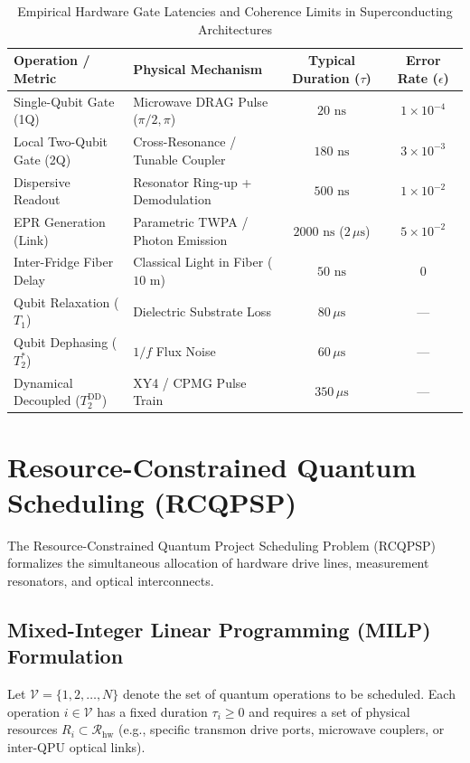 \begin{table}[htbp]
    \centering
    \caption{Empirical Hardware Gate Latencies and Coherence Limits in Superconducting Architectures}
    \label{tab:hardware_latencies_ch09}
    \begin{tabularx}{\textwidth}{X X c c}
        \toprule
        \textbf{Operation / Metric} & \textbf{Physical Mechanism} & \textbf{Typical Duration ($\tau$)} & \textbf{Error Rate ($\epsilon$)} \\
        \midrule
        Single-Qubit Gate (1Q) & Microwave DRAG Pulse ($\pi/2, \pi$) & $20\text{ ns}$ & $1 \times 10^{-4}$ \\
        Local Two-Qubit Gate (2Q) & Cross-Resonance / Tunable Coupler & $180\text{ ns}$ & $3 \times 10^{-3}$ \\
        Dispersive Readout & Resonator Ring-up + Demodulation & $500\text{ ns}$ & $1 \times 10^{-2}$ \\
        EPR Generation (Link) & Parametric TWPA / Photon Emission & $2000\text{ ns}$ ($2\,\mu\text{s}$) & $5 \times 10^{-2}$ \\
        Inter-Fridge Fiber Delay & Classical Light in Fiber ($10\text{ m}$) & $50\text{ ns}$ & $0$ \\
        Qubit Relaxation ($T_1$) & Dielectric Substrate Loss & $80\,\mu\text{s}$ & --- \\
        Qubit Dephasing ($T_2^*$) & $1/f$ Flux Noise & $60\,\mu\text{s}$ & --- \\
        Dynamical Decoupled ($T_2^{\text{DD}}$) & XY4 / CPMG Pulse Train & $350\,\mu\text{s}$ & --- \\
        \bottomrule
    \end{tabularx}
\end{table}

\section{Resource-Constrained Quantum Scheduling (RCQPSP)}
\label{sec:rcqpsp_formulation}

The Resource-Constrained Quantum Project Scheduling Problem (RCQPSP) formalizes the simultaneous allocation of hardware drive lines, measurement resonators, and optical interconnects.

\subsection{Mixed-Integer Linear Programming (MILP) Formulation}
Let $\mathcal{V} = \{1, 2, \dots, N\}$ denote the set of quantum operations to be scheduled. Each operation $i \in \mathcal{V}$ has a fixed duration $\tau_i \ge 0$ and requires a set of physical resources $R_i \subset \mathcal{R}_{\text{hw}}$ (e.g., specific transmon drive ports, microwave couplers, or inter-QPU optical links).

